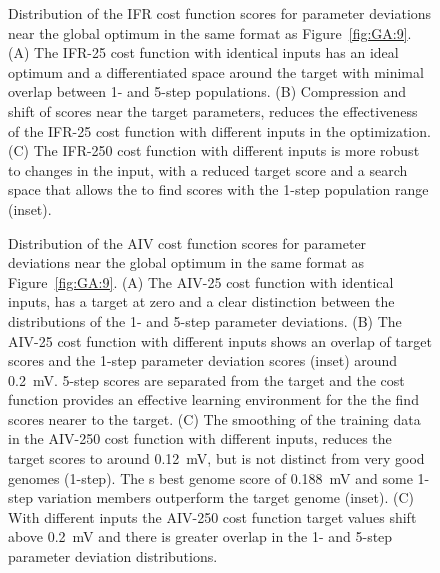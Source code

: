   \begin{figure}[htb]
    \centering

    \caption{Distribution of the IFR cost function scores for
      parameter deviations near the global optimum in the same format
      as Figure~\ref{fig:GA:9}.  (A) The IFR-25 cost function with
      identical {\ANF} inputs has an ideal optimum and a differentiated
      space around the target with minimal overlap between 1- and
      5-step populations. (B) Compression and shift of scores near the
      target parameters, reduces the effectiveness of the IFR-25 cost
      function with different {\ANF} inputs in the {\GA} optimization. (C)
      The IFR-250 cost function with different {\ANF} inputs is more
      robust to changes in the input, with a reduced target score and
      a search space that allows the {\GA} to find scores with the 1-step
      population range (inset).}
    \label{fig:GA:10}
  \end{figure}



  \begin{figure}[htb]
    \centering
    \caption{Distribution of the AIV cost function scores for
      parameter deviations near the global optimum in the same format
      as Figure~\ref{fig:GA:9}.  (A) The AIV-25 cost function with
      identical inputs, has a target at zero and a clear distinction
      between the distributions of the 1- and 5-step parameter
      deviations.  (B) The AIV-25 cost function with different inputs
      shows an overlap of target scores and the 1-step parameter
      deviation scores (inset) around 0.2~mV. 5-step scores are
      separated from the target and the cost function provides an
      effective learning environment for the {\GA} the find scores nearer
      to the target. (C) The smoothing of the training data in the
      AIV-250 cost function with different inputs, reduces the target
      scores to around 0.12~mV, but is not distinct from very good
      genomes (1-step). The {\GA}s best genome score of 0.188~mV and
      some 1-step variation members outperform the target genome
      (inset). (C) With different inputs the AIV-250 cost function
      target values shift above 0.2~mV and there is greater overlap in
      the 1- and 5-step parameter deviation distributions.}
    \label{fig:GA:11}
  \end{figure}


